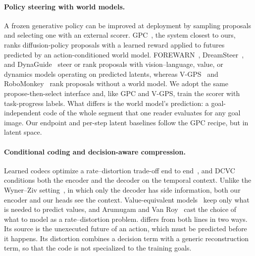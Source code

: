 \paragraph{Policy steering with world models.}
A frozen generative policy can be improved at deployment by sampling proposals and selecting one with an external scorer.
GPC~\cite{qi2025gpc}, the system closest to ours, ranks diffusion-policy proposals with a learned reward applied to futures predicted by an action-conditioned world model.
FOREWARN~\cite{wu2025forewarn}, DreamSteer~\cite{cui2026dreamsteer}, and DynaGuide~\cite{du2025dynaguide} steer or rank proposals with vision--language, value, or dynamics models operating on predicted latents, whereas V-GPS~\cite{nakamoto2024vgps} and RoboMonkey~\cite{kwok2025robomonkey} rank proposals without a world model.
We adopt the same propose-then-select interface and, like GPC and V-GPS, train the scorer with task-progress labels.
What differs is the world model's prediction: a goal-independent code of the whole segment that one reader evaluates for any goal image.
Our endpoint and per-step latent baselines follow the GPC recipe, but in latent space.

\paragraph{Conditional coding and decision-aware compression.}
Learned codecs optimize a rate--distortion trade-off end to end~\cite{balle2017end}, and DCVC~\cite{li2021dcvc} conditions both the encoder and the decoder on the temporal context.
Unlike the Wyner--Ziv setting~\cite{wyner1976ratedistortion}, in which only the decoder has side information, both our encoder and our heads see the context.
Value-equivalent models~\cite{grimm2020value,schrittwieser2020muzero} keep only what is needed to predict values, and Arumugam and Van Roy~\cite{arumugam2022deciding} cast the choice of what to model as a rate--distortion problem.
\method differs from both lines in two ways.
Its source is the unexecuted future of an action, which must be predicted before it happens.
Its distortion combines a decision term with a generic reconstruction term, so that the code is not specialized to the training goals.
